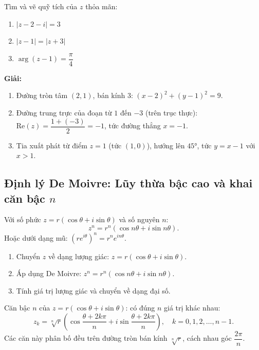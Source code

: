 \documentclass[12pt,a4paper]{article}
\begin{document}
\begin{vidu}
  Tìm và vẽ quỹ tích của $z$ thỏa mãn:
  \begin{enumerate}[label=(\alph*)]
    \item $|z - 2 - i| = 3$
    \item $|z - 1| = |z + 3|$
    \item $\arg(z - 1) = \dfrac{\pi}{4}$
  \end{enumerate}

  \medskip\textbf{Giải:}
  \begin{enumerate}[label=(\alph*)]
    \item Đường tròn tâm $(2, 1)$, bán kính $3$: $(x-2)^2 + (y-1)^2 = 9$.
    \item Đường trung trực của đoạn từ $1$ đến $-3$ (trên trục thực): $\text{Re}(z) = \dfrac{1+(-3)}{2} = -1$, tức đường thẳng $x = -1$.
    \item Tia xuất phát từ điểm $z = 1$ (tức $(1,0)$), hướng lên $45°$, tức $y = x - 1$ với $x > 1$.
  \end{enumerate}
\end{vidu}

\subsection{Định lý De Moivre: Lũy thừa bậc cao và khai căn bậc $n$}

\begin{dinhly}[title={Định lý De Moivre}]
  Với số phức $z = r(\cos\theta + i\sin\theta)$ và số nguyên $n$:
  \[
    z^n = r^n(\cos n\theta + i\sin n\theta).
  \]
  Hoặc dưới dạng mũ: $(re^{i\theta})^n = r^n e^{in\theta}$.
\end{dinhly}

\begin{phuongphap}[title={Tính lũy thừa bậc cao}]
  \begin{enumerate}
    \item Chuyển $z$ về dạng lượng giác: $z = r(\cos\theta + i\sin\theta)$.
    \item Áp dụng De Moivre: $z^n = r^n(\cos n\theta + i\sin n\theta)$.
    \item Tính giá trị lượng giác và chuyển về dạng đại số.
  \end{enumerate}
\end{phuongphap}

\begin{congthuc}[title={Khai căn bậc $n$ của số phức}]
  Căn bậc $n$ của $z = r(\cos\theta + i\sin\theta)$: có đúng $n$ giá trị khác nhau:
  \[
    z_k = \sqrt[n]{r}\left(\cos\frac{\theta + 2k\pi}{n} + i\sin\frac{\theta + 2k\pi}{n}\right), \quad k = 0, 1, 2, \ldots, n-1.
  \]
  Các căn này phân bố đều trên đường tròn bán kính $\sqrt[n]{r}$, cách nhau góc $\dfrac{2\pi}{n}$.
\end{congthuc}
\end{document}
